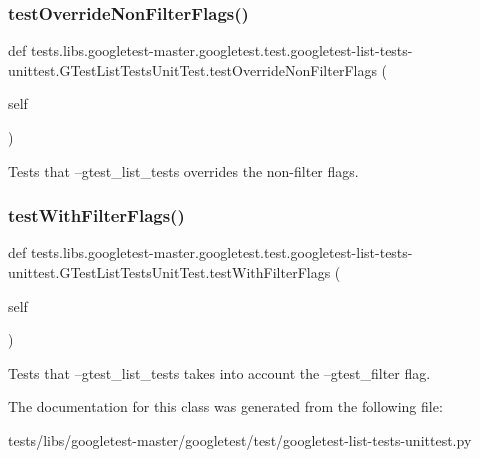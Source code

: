\subsubsection{\texorpdfstring{test\+Override\+Non\+Filter\+Flags()}{testOverrideNonFilterFlags()}}
{\footnotesize\ttfamily def tests.\+libs.\+googletest-\/master.\+googletest.\+test.\+googletest-\/list-\/tests-\/unittest.\+G\+Test\+List\+Tests\+Unit\+Test.\+test\+Override\+Non\+Filter\+Flags (\begin{DoxyParamCaption}\item[{}]{self }\end{DoxyParamCaption})}

\begin{DoxyVerb}Tests that --gtest_list_tests overrides the non-filter flags.\end{DoxyVerb}
 \mbox{\label{classtests_1_1libs_1_1googletest-master_1_1googletest_1_1test_1_1googletest-list-tests-unittest_1_1GTestListTestsUnitTest_af89d05616eed02e4012ef2a0aae51b7d}} 
\subsubsection{\texorpdfstring{test\+With\+Filter\+Flags()}{testWithFilterFlags()}}
{\footnotesize\ttfamily def tests.\+libs.\+googletest-\/master.\+googletest.\+test.\+googletest-\/list-\/tests-\/unittest.\+G\+Test\+List\+Tests\+Unit\+Test.\+test\+With\+Filter\+Flags (\begin{DoxyParamCaption}\item[{}]{self }\end{DoxyParamCaption})}

\begin{DoxyVerb}Tests that --gtest_list_tests takes into account the
--gtest_filter flag.\end{DoxyVerb}
 

The documentation for this class was generated from the following file\+:\begin{DoxyCompactItemize}
\item 
tests/libs/googletest-\/master/googletest/test/googletest-\/list-\/tests-\/unittest.\+py\end{DoxyCompactItemize}
